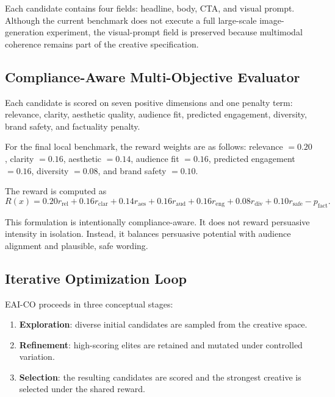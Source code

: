 \documentclass[applsci,article,submit,pdftex,moreauthors]{Definitions/mdpi}
\begin{document}
Each candidate contains four fields: headline, body, CTA, and visual prompt. Although the current benchmark does not execute a full large-scale image-generation experiment, the visual-prompt field is preserved because multimodal coherence remains part of the creative specification.

\subsection{Compliance-Aware Multi-Objective Evaluator}

Each candidate is scored on seven positive dimensions and one penalty term: relevance, clarity, aesthetic quality, audience fit, predicted engagement, diversity, brand safety, and factuality penalty.

For the final local benchmark, the reward weights are as follows: relevance $=0.20$, clarity $=0.16$, aesthetic $=0.14$, audience fit $=0.16$, predicted engagement $=0.16$, diversity $=0.08$, and brand safety $=0.10$.

The reward is computed as
\begin{equation}
R(x) = 0.20r_{\mathrm{rel}} + 0.16r_{\mathrm{clar}} + 0.14r_{\mathrm{aes}} + 0.16r_{\mathrm{aud}} + 0.16r_{\mathrm{eng}} + 0.08r_{\mathrm{div}} + 0.10r_{\mathrm{safe}} - p_{\mathrm{fact}}.
\end{equation}

This formulation is intentionally compliance-aware. It does not reward persuasive intensity in isolation. Instead, it balances persuasive potential with audience alignment and plausible, safe wording.

\subsection{Iterative Optimization Loop}

EAI-CO proceeds in three conceptual stages:
\begin{enumerate}[leftmargin=1.5em]
    \item \textbf{Exploration}: diverse initial candidates are sampled from the creative space.
    \item \textbf{Refinement}: high-scoring elites are retained and mutated under controlled variation.
    \item \textbf{Selection}: the resulting candidates are scored and the strongest creative is selected under the shared reward.
\end{enumerate}
\end{document}
